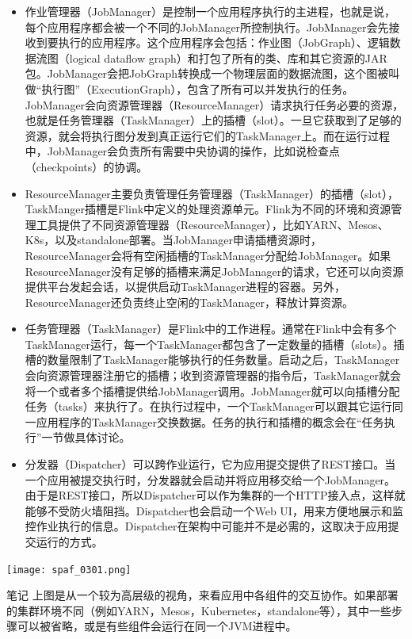 \documentclass[oneside]{ctexbook}
\begin{document}
\begin{itemize}
  \item 作业管理器（JobManager）是控制一个应用程序执行的主进程，也就是说，每个应用程序都会被一个不同的JobManager所控制执行。JobManager会先接收到要执行的应用程序。这个应用程序会包括：作业图（JobGraph）、逻辑数据流图（logical dataflow graph）和打包了所有的类、库和其它资源的JAR包。JobManager会把JobGraph转换成一个物理层面的数据流图，这个图被叫做“执行图”（ExecutionGraph），包含了所有可以并发执行的任务。JobManager会向资源管理器（ResourceManager）请求执行任务必要的资源，也就是任务管理器（TaskManager）上的插槽（slot）。一旦它获取到了足够的资源，就会将执行图分发到真正运行它们的TaskManager上。而在运行过程中，JobManager会负责所有需要中央协调的操作，比如说检查点（checkpoints）的协调。
  \item ResourceManager主要负责管理任务管理器（TaskManager）的插槽（slot），TaskManger插槽是Flink中定义的处理资源单元。Flink为不同的环境和资源管理工具提供了不同资源管理器（ResourceManager），比如YARN、Mesos、K8s，以及standalone部署。当JobManager申请插槽资源时，ResourceManager会将有空闲插槽的TaskManager分配给JobManager。如果ResourceManager没有足够的插槽来满足JobManager的请求，它还可以向资源提供平台发起会话，以提供启动TaskManager进程的容器。另外，ResourceManager还负责终止空闲的TaskManager，释放计算资源。
  \item 任务管理器（TaskManager）是Flink中的工作进程。通常在Flink中会有多个TaskManager运行，每一个TaskManager都包含了一定数量的插槽（slots）。插槽的数量限制了TaskManager能够执行的任务数量。启动之后，TaskManager会向资源管理器注册它的插槽；收到资源管理器的指令后，TaskManager就会将一个或者多个插槽提供给JobManager调用。JobManager就可以向插槽分配任务（tasks）来执行了。在执行过程中，一个TaskManager可以跟其它运行同一应用程序的TaskManager交换数据。任务的执行和插槽的概念会在“任务执行”一节做具体讨论。
  \item 分发器（Dispatcher）可以跨作业运行，它为应用提交提供了REST接口。当一个应用被提交执行时，分发器就会启动并将应用移交给一个JobManager。由于是REST接口，所以Dispatcher可以作为集群的一个HTTP接入点，这样就能够不受防火墙阻挡。Dispatcher也会启动一个Web UI，用来方便地展示和监控作业执行的信息。Dispatcher在架构中可能并不是必需的，这取决于应用提交运行的方式。
\end{itemize}

\noindent \texttt{[image: spaf\_0301.png]}

\begin{bclogo}[logo=\bcinfo, couleurBarre=orange, noborder=true, couleur=white]{笔记}
上图是从一个较为高层级的视角，来看应用中各组件的交互协作。如果部署的集群环境不同（例如YARN，Mesos，Kubernetes，standalone等），其中一些步骤可以被省略，或是有些组件会运行在同一个JVM进程中。
\end{bclogo}
\end{document}
